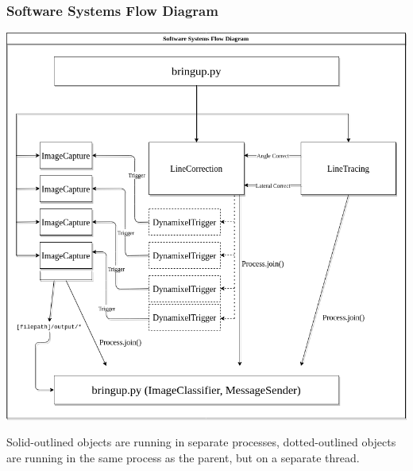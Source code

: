 \documentclass[11pt, hidelinks]{report}
\begin{document}
\subsubsection{Software Systems Flow Diagram} \label{app:sysdiag}
	\begin{center}
	    \includegraphics[scale=0.60]{softwaresystemsflow.png}
	\end{center}
Solid-outlined objects are running in separate processes, dotted-outlined objects are running in the same process as the parent, but on a separate thread.
\end{document}
